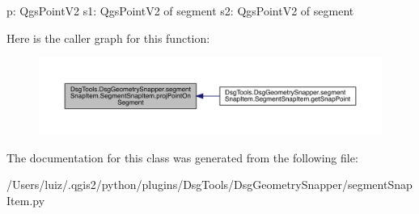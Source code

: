 \begin{DoxyVerb}p: QgsPointV2
s1: QgsPointV2 of segment
s2: QgsPointV2 of segment
\end{DoxyVerb}
 Here is the caller graph for this function\+:
\nopagebreak
\begin{figure}[H]
\begin{center}
\leavevmode
\includegraphics[width=350pt]{class_dsg_tools_1_1_dsg_geometry_snapper_1_1segment_snap_item_1_1_segment_snap_item_a0e1482462bb375b0e1c63b63353ecaee_icgraph}
\end{center}
\end{figure}


The documentation for this class was generated from the following file\+:\begin{DoxyCompactItemize}
\item 
/\+Users/luiz/.\+qgis2/python/plugins/\+Dsg\+Tools/\+Dsg\+Geometry\+Snapper/segment\+Snap\+Item.\+py\end{DoxyCompactItemize}
